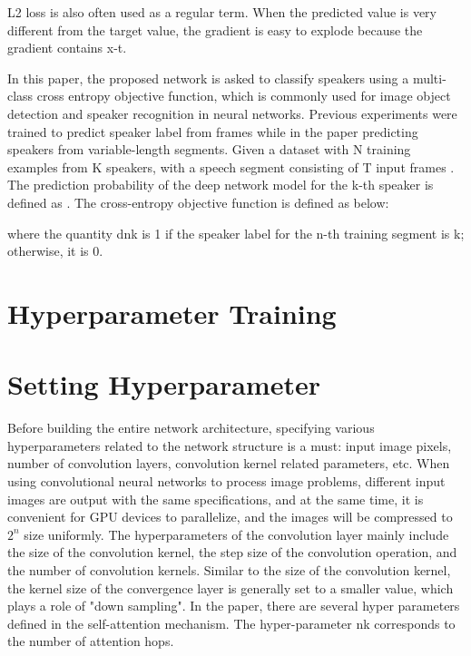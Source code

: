 L2 loss is also often used as a regular term. When the predicted value is very different from the target value, the gradient is easy to explode because the gradient contains x-t.


In this paper, the proposed network is asked to classify speakers using a multi-class cross entropy objective function, which is commonly used for image object detection and speaker recognition in neural networks. Previous experiments were trained to predict speaker label from frames while in the paper predicting speakers from variable-length segments. Given a dataset with N training examples from K speakers, with a speech segment consisting of T input frames  . The prediction probability of the deep network model for the k-th speaker is defined as  .
The cross-entropy objective function is defined as below:

where the quantity dnk is 1 if the speaker label for the n-th training segment is k; otherwise, it is 0. 

\section{Hyperparameter Training}
\label{cha:training/hyperparameter training}

\section{Setting Hyperparameter}
\label{cha:training/setting hyperparameter}

Before building the entire network architecture, specifying various hyperparameters related to the network structure is a must: input image pixels, number of convolution layers, convolution kernel related parameters, etc.
When using convolutional neural networks to process image problems, different input images are output with the same specifications, and at the same time, it is convenient for GPU devices to parallelize, and the images will be compressed to $2^n$ size uniformly.
The hyperparameters of the convolution layer mainly include the size of the convolution kernel, the step size of the convolution operation, and the number of convolution kernels.
Similar to the size of the convolution kernel, the kernel size of the convergence layer is generally set to a smaller value, which plays a role of "down sampling".
In the paper, there are several hyper parameters defined in the self-attention mechanism. The hyper-parameter nk corresponds to the number of attention hops.

